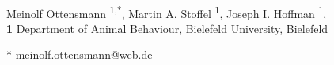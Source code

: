 \documentclass[10pt,letterpaper]{article}
\date{}
\begin{document}
\vspace*{0.2in}
\def\code#1{\texttt{#1}}
\begin{flushleft}
{\Large
\textbf{} 
}
\newline
\\
Meinolf Ottensmann \textsuperscript{1,*},
Martin A. Stoffel \textsuperscript{1},
Joseph I. Hoffman \textsuperscript{1},
\\
\bigskip
\textbf{1} Department of Animal Behaviour, Bielefeld University, Bielefeld
\\
\bigskip

% 
%





* meinolf.ottensmann@web.de

\end{flushleft}
\end{document}
